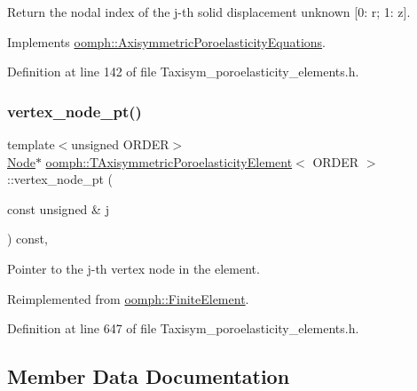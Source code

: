 Return the nodal index of the j-\/th solid displacement unknown \mbox{[}0\+: r; 1\+: z\mbox{]}. 



Implements \hyperlink{classoomph_1_1AxisymmetricPoroelasticityEquations_a258196c8f66ba5eec329565fa66dfcc7}{oomph\+::\+Axisymmetric\+Poroelasticity\+Equations}.



Definition at line 142 of file Taxisym\+\_\+poroelasticity\+\_\+elements.\+h.

\mbox{\label{classoomph_1_1TAxisymmetricPoroelasticityElement_a1749e03cc97bca4463870f4640e444b0}} 
\subsubsection{\texorpdfstring{vertex\+\_\+node\+\_\+pt()}{vertex\_node\_pt()}}
{\footnotesize\ttfamily template$<$unsigned O\+R\+D\+ER$>$ \\
\hyperlink{classoomph_1_1Node}{Node}$\ast$ \hyperlink{classoomph_1_1TAxisymmetricPoroelasticityElement}{oomph\+::\+T\+Axisymmetric\+Poroelasticity\+Element}$<$ O\+R\+D\+ER $>$\+::vertex\+\_\+node\+\_\+pt (\begin{DoxyParamCaption}\item[{const unsigned \&}]{j }\end{DoxyParamCaption}) const\hspace{0.3cm}{\ttfamily [inline]}, {\ttfamily [virtual]}}



Pointer to the j-\/th vertex node in the element. 



Reimplemented from \hyperlink{classoomph_1_1FiniteElement_a863c4382c879a77ad5607c6f9781c761}{oomph\+::\+Finite\+Element}.



Definition at line 647 of file Taxisym\+\_\+poroelasticity\+\_\+elements.\+h.



\subsection{Member Data Documentation}
\mbox{\label{classoomph_1_1TAxisymmetricPoroelasticityElement_aeb45073b85caee99c4e18eb9de35503b}} 
